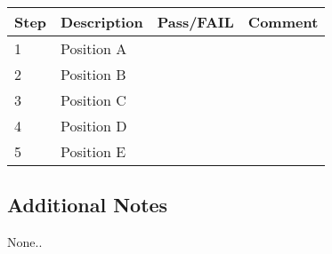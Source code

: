 \begin{table}[H]
    \begin{tabular}{|l| p{5cm} |l| p{5cm} |}
    \hline
    {\bf Step} & {\bf Description} & {\bf Pass/FAIL} & {\bf Comment}  \\ \hline
    1 & Position A &  &  \\ \hline
    2 & Position B &  &  \\ \hline
    3 & Position C &  &  \\ \hline
    4 & Position D &  &  \\ \hline
    5 & Position E &  &  \\ \hline
    \end{tabular}
\end{table}


\subsection{Additional Notes}

None..
